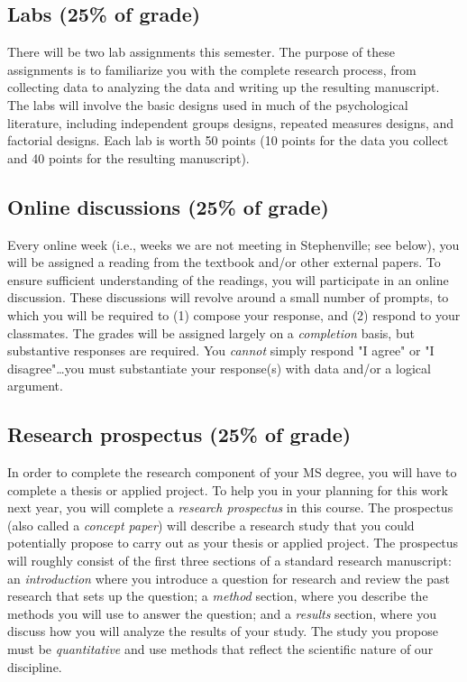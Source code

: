 \documentclass[10pt]{article}
\begin{document}
\subsection*{Labs (25\% of grade)}
\label{sec-5-2}
There will be two lab assignments this semester.  The purpose of these assignments is to familiarize you with the complete research process, from collecting data to analyzing the data and writing up the resulting manuscript. The labs will involve the basic designs used in much of the psychological literature, including independent groups designs, repeated measures designs, and factorial designs.  Each lab is worth 50 points (10 points for the data you collect and 40 points for the resulting manuscript). 

\subsection*{Online discussions (25\% of grade)}
\label{sec-5-3}
Every online week (i.e., weeks we are not meeting in Stephenville; see below), you will be assigned a reading from the textbook and/or other external papers.  To ensure sufficient understanding of the readings, you will participate in an online discussion.  These discussions will revolve around a small number of prompts, to which you will be required to (1) compose your response, and (2) respond to your classmates.  The grades will be assigned largely on a \emph{completion} basis, but substantive responses are required.  You \emph{cannot} simply respond "I agree" or "I disagree"\ldots{}you must substantiate your response(s) with data and/or a logical argument. 

\subsection*{Research prospectus (25\% of grade)}
\label{sec-5-4}
In order to complete the research component of your MS degree, you will have to complete a thesis or applied project.  To help you in your planning for this work next year, you will complete a \emph{research prospectus} in this course.  The prospectus (also called a \emph{concept paper}) will describe a research study that you could potentially propose to carry out as your thesis or applied project.  The prospectus will roughly consist of the first three sections of a standard research manuscript: an \emph{introduction} where you introduce a question for research and review the past research that sets up the question; a \emph{method} section, where you describe the methods you will use to answer the question; and a \emph{results} section, where you discuss how you will analyze the results of your study.  The study you propose must be \emph{quantitative} and use methods that reflect the scientific nature of our discipline. 
\end{document}
